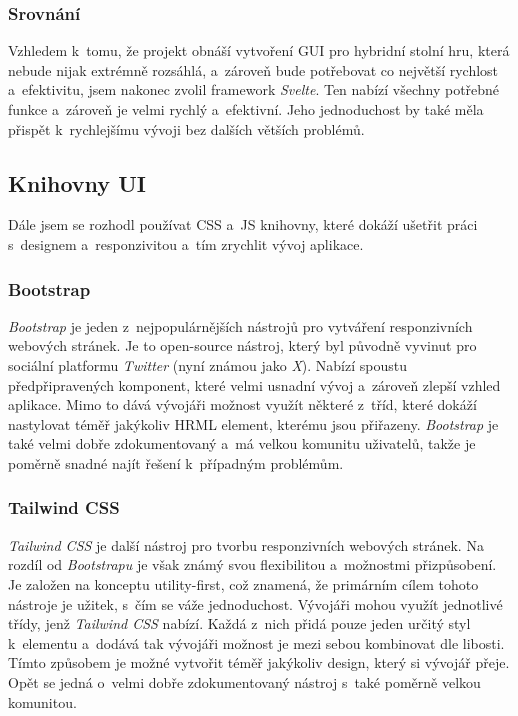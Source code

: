 \subsubsection*{Srovnání}
Vzhledem k~tomu, že projekt obnáší vytvoření GUI pro hybridní stolní hru, která nebude nijak extrémně rozsáhlá, a~zároveň bude potřebovat co největší rychlost a~efektivitu, jsem nakonec zvolil framework \textit{Svelte}. Ten nabízí všechny potřebné funkce a~zároveň je velmi rychlý a~efektivní. Jeho jednoduchost by také měla přispět k~rychlejšímu vývoji bez dalších větších problémů.

\subsection{Knihovny UI}
Dále jsem se rozhodl používat CSS a~JS knihovny, které dokáží ušetřit práci s~designem a~responzivitou a~tím zrychlit vývoj aplikace.

\subsubsection*{Bootstrap}
\textit{Bootstrap} je jeden z~nejpopulárnějších nástrojů pro vytváření responzivních webových stránek. Je to open-source nástroj, který byl původně vyvinut pro sociální platformu \textit{Twitter} (nyní známou jako \textit{X}). Nabízí spoustu předpřipravených komponent, které velmi usnadní vývoj a~zároveň zlepší vzhled aplikace. Mimo to dává vývojáři možnost využít některé z~tříd, které dokáží nastylovat téměř jakýkoliv HRML element, kterému jsou přiřazeny. \textit{Bootstrap} je také velmi dobře zdokumentovaný a~má velkou komunitu uživatelů, takže je poměrně snadné najít řešení k~případným problémům. \cite{bootstrap,what_is_bootstrap}

\subsubsection*{Tailwind CSS}
\textit{Tailwind CSS} je další nástroj pro tvorbu responzivních webových stránek. Na rozdíl od \textit{Bootstrapu} je však známý svou flexibilitou a~možnostmi přizpůsobení. Je založen na konceptu utility-first, což znamená, že primárním cílem tohoto nástroje je užitek, s~čím se váže jednoduchost. Vývojáři mohou využít jednotlivé třídy, jenž \textit{Tailwind CSS} nabízí. Každá z~nich přidá pouze jeden určitý styl k~elementu a~dodává tak vývojáři možnost je mezi sebou kombinovat dle libosti. Tímto způsobem je možné vytvořit téměř jakýkoliv design, který si vývojář přeje. Opět se jedná o~velmi dobře zdokumentovaný nástroj s~také poměrně velkou komunitou. \cite{tailwind_css}

